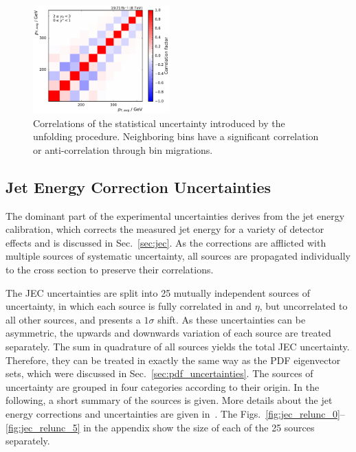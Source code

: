 \begin{figure}[htbp]
    \includegraphics[width=0.47\textwidth]{figures/measurement/unf_nlo_corr_yb2ys0.pdf}
    \caption[Correlations of statistical uncertainty]{Correlations of the
        statistical uncertainty introduced by the unfolding procedure.
        Neighboring bins have a significant correlation or anti-correlation
        through bin migrations.}
    \label{fig:corr_unfolding_nlo}
\end{figure}

\subsection{Jet Energy Correction Uncertainties}

The dominant part of the experimental uncertainties derives from the jet energy
calibration, which corrects the measured jet energy for a variety of detector
effects and is discussed in Sec.~\ref{sec:jec}. As the corrections are afflicted
with multiple sources of systematic uncertainty, all sources are propagated
individually to the cross section to preserve their correlations.

The JEC uncertainties are split into 25 mutually independent sources of
uncertainty, in which each source is fully correlated in \pt and $\eta$,
but uncorrelated to all other sources, and presents a $1\sigma$
shift. As these uncertainties can be asymmetric, the upwards and downwards
variation of each source are treated separately. The sum in quadrature of all
sources yields the total JEC uncertainty. Therefore, they can be treated
in exactly the same way as the PDF eigenvector sets, which were discussed in
Sec.~\ref{sec:pdf_uncertainties}. The sources of uncertainty are grouped in four
categories according to their origin. In the following, a short summary of the
sources is given. More details about the jet energy corrections and
uncertainties are given in~\cite{jec_paper}. The
Figs.~\ref{fig:jec_relunc_0}--\ref{fig:jec_relunc_5} in the appendix show the
size of each of the 25 sources separately.

